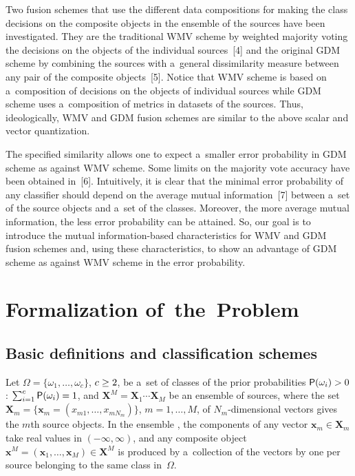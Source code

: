 \begin{multicols}{2}
Two fusion schemes that use the different data compositions for 
making the class decisions on the composite objects in the ensemble of the sources
have been investigated. 
They are the traditional WMV scheme by weighted majority voting the decisions 
on the objects of the individual sources~[4] and the original GDM scheme by 
combining the sources with a~general dissimilarity measure between any pair of the 
composite objects~[5]. Notice that WMV scheme is based on a~composition of 
decisions on the objects of individual sources while GDM scheme uses 
a~composition of metrics in datasets of the sources. Thus, ideologically, WMV 
and GDM fusion schemes are similar to the above scalar and vector quantization.

The specified similarity allows one to expect a~smaller error probability in GDM 
scheme as against WMV scheme. Some limits on the majority vote accuracy have 
been obtained in~[6]. Intuitively, it is clear that the minimal error probability of 
any classifier should depend on the average mutual information~[7] between a~set 
of the source objects and a~set of the classes. Moreover, the more average mutual 
information, the less error probability can be attained. So, our goal is to introduce 
the mutual information-based characteristics for WMV and GDM fusion schemes 
and, using these characteristics, to show an advantage of GDM scheme as against 
WMV scheme in the error probability. 

\section{Formalization of~the~Problem}


\subsection{Basic definitions and classification schemes}

\noindent
Let $\Omega=\{\omega_1, \ldots ,\omega_c\}$, $c\hm\geq 2$, be a~set of classes 
of the prior probabilities ${\sf P}(\omega_i)> 0$: $\sum\nolimits^c_{i=1} 
{\sf P}(\omega_i)=1$, and $\mathbf{X}^M= \mathbf{X}_1\cdots \mathbf{X}_M$ be 
an ensemble of sources, where the set $\mathbf{X}_m =\{\mathbf{x}_m= 
(x_{m1}, \ldots , x_{mN_m})\}$, $m=1,\ldots, M$, of $N_m$-dimensional 
vectors gives the $m$th source objects. In the ensemble , the components of 
any vector $\mathbf{x}_m\in \mathbf{X}_m$ take real values in $(-\infty, \infty)$, 
and any composite object $\mathbf{x}^M=(\mathbf{x}_1, \ldots ,
\mathbf{x}_M)\in \mathbf{X}^M$ is produced by a~collection of the vectors by 
one per source belonging to the same class in~$\Omega$.


\end{multicols}
